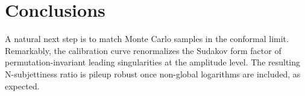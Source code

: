 \section{Conclusions}\label{sec:conclusions}

A natural next step is to match Monte Carlo samples in the conformal
limit. Remarkably, the calibration curve renormalizes the Sudakov form
factor of permutation-invariant leading singularities at the amplitude
level. The resulting N-subjettiness ratio is pileup robust once
non-global logarithms are included, as expected.

